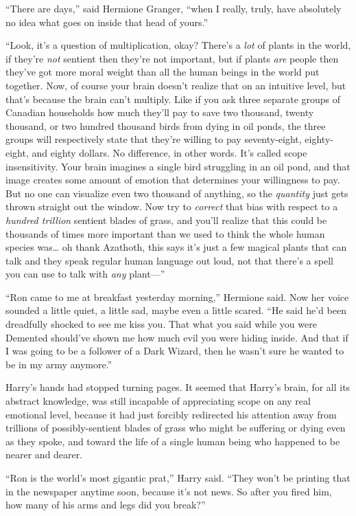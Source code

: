``There are days,'' said Hermione Granger, ``when I really, truly, have
absolutely no idea what goes on inside that head of yours.''

``Look, it's a question of multiplication, okay? There's a \emph{lot} of
plants in the world, if they're \emph{not} sentient then they're not
important, but if plants \emph{are} people then they've got more moral
weight than all the human beings in the world put together. Now, of
course your brain doesn't realize that on an intuitive level, but that's
because the brain can't multiply. Like if you ask three separate groups
of Canadian households how much they'll pay to save two thousand, twenty
thousand, or two hundred thousand birds from dying in oil ponds, the
three groups will respectively state that they're willing to pay
seventy-eight, eighty-eight, and eighty dollars. No difference, in other
words. It's called scope insensitivity. Your brain imagines a single
bird struggling in an oil pond, and that image creates some amount of
emotion that determines your willingness to pay. But no one can
visualize even two thousand of anything, so the \emph{quantity} just
gets thrown straight out the window. Now try to \emph{correct} that bias
with respect to a \emph{hundred trillion} sentient blades of grass, and
you'll realize that this could be thousands of times more important than
we used to think the whole human species was\ldots{} oh thank Azathoth,
this says it's just a few magical plants that can talk and they speak
regular human language out loud, not that there's a spell you can use to
talk with \emph{any} plant---''

``Ron came to me at breakfast yesterday morning,'' Hermione said. Now
her voice sounded a little quiet, a little sad, maybe even a little
scared. ``He said he'd been dreadfully shocked to see me kiss you. That
what you said while you were Demented should've shown me how much evil
you were hiding inside. And that if I was going to be a follower of a
Dark Wizard, then he wasn't sure he wanted to be in my army anymore.''

Harry's hands had stopped turning pages. It seemed that Harry's brain,
for all its abstract knowledge, was still incapable of appreciating
scope on any real emotional level, because it had just forcibly
redirected his attention away from trillions of possibly-sentient blades
of grass who might be suffering or dying even as they spoke, and toward
the life of a single human being who happened to be nearer and dearer.

``Ron is the world's most gigantic prat,'' Harry said. ``They won't be
printing that in the newspaper anytime soon, because it's not news. So
after you fired him, how many of his arms and legs did you break?''


